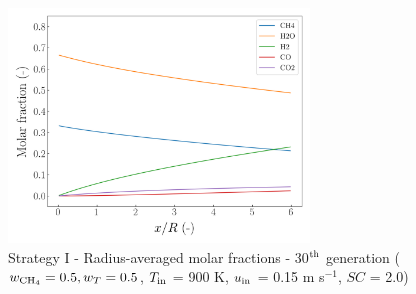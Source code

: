 \documentclass[preprint,12pt]{elsarticle}
\begin{document}
%

\begin{figure}[h!]
\centering
\includegraphics[width=80mm]{results/5/50C_50T/GEN30-AVG.png}
\caption{\label{fig:5R5050G30-avg} Strategy I - Radius-averaged molar fractions -  30$^{\rm{th}}$ generation ($w_{\rm{CH_4}} = 0.5, w_T = 0.5$, $T_{\rm{in}}$ = 900 K, $u_{\rm{in}}$ = 0.15 m s$^{-1}$, $SC$ = 2.0)}
\end{figure}
\end{document}
